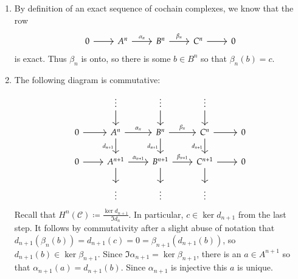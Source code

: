 \documentclass[12pt]{article}
\theoremstyle{definition}
\theoremstyle{definitionstyle}
\begin{document}
    \begin{enumerate}[label=(\alph*)]
        \item By definition of an exact sequence of cochain complexes, we know that the row
        \[\begin{tikzcd}
            0 & {A^n} & {B^n} & {C^n} & 0
            \arrow[from=1-1, to=1-2]
            \arrow["{\alpha_n}", from=1-2, to=1-3]
            \arrow["{\beta_n}", from=1-3, to=1-4]
            \arrow[from=1-4, to=1-5]
        \end{tikzcd}\]
        is exact. Thus $\beta_n$ is onto, so there is some $b \in B^n$ so that $\beta_n(b) = c$.
        \item The following diagram is commutative:
        \[\begin{tikzcd}
            & \vdots & \vdots & \vdots \\
            0 & {A^n} & {B^n} & {C^n} & 0 \\
            0 & {A^{n+1}} & {B^{n+1}} & {C^{n+1}} & 0 \\
            & \vdots & \vdots & \vdots
            \arrow[from=1-2, to=2-2]
            \arrow[from=1-3, to=2-3]
            \arrow[from=1-4, to=2-4]
            \arrow[from=2-1, to=2-2]
            \arrow["{\alpha_n}", from=2-2, to=2-3]
            \arrow["{d_{n+1}}"', from=2-2, to=3-2]
            \arrow["{\beta_n}", from=2-3, to=2-4]
            \arrow["{d_{n+1}}"', from=2-3, to=3-3]
            \arrow[from=2-4, to=2-5]
            \arrow["{d_{n+1}}"', from=2-4, to=3-4]
            \arrow[from=3-1, to=3-2]
            \arrow["{\alpha_{n+1}}", from=3-2, to=3-3]
            \arrow[from=3-2, to=4-2]
            \arrow["{\beta_{n+1}}", from=3-3, to=3-4]
            \arrow[from=3-3, to=4-3]
            \arrow[from=3-4, to=3-5]
            \arrow[from=3-4, to=4-4]
        \end{tikzcd}\]
        Recall that $H^n(\mathscr C) \coloneqq \frac{\ker d_{n+1}}{\Im d_n}$. In particular, $c \in \ker d_{n+1}$ from the last step. It follows by commutativity after a slight abuse of notation that $d_{n+1}(\beta_n(b)) = d_{n+1}(c) = 0 = \beta_{n+1}(d_{n+1}(b))$, so $d_{n+1}(b) \in \ker \beta_{n+1}$. Since $\Im \alpha_{n+1} = \ker \beta_{n+1}$, there is an $a \in A^{n+1}$ so that $\alpha_{n+1}(a) = d_{n+1}(b)$. Since $\alpha_{n+1}$ is injective this $a$ is unique.


\end{enumerate}
\end{document}
